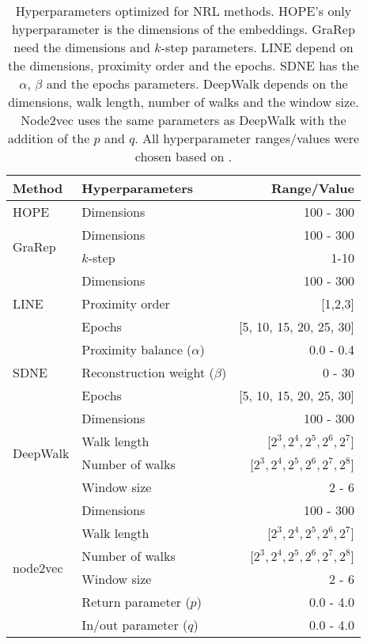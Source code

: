 \begin{table}[ht!]
    \centering
    \begin{tabular}{ |l|l|r| } 
        \hline
        \textbf{Method} & \textbf{Hyperparameters} & \textbf{Range/Value} \\
        \hline
        HOPE & Dimensions & 100 - 300 \\
        \hline
        \multirow{2}{5em}{GraRep} & Dimensions & 100 - 300 \\ 
            & $k$-step & 1-10 \\ 
        \hline
        \multirow{3}{4em}{LINE} & Dimensions & 100 - 300 \\ 
            & Proximity order & [1,2,3] \\
            & Epochs & [5, 10, 15, 20, 25, 30] \\
        \hline
        \multirow{3}{5em}{SDNE} & Proximity balance ($\alpha$) & 0.0 - 0.4 \\ 
            & Reconstruction weight ($\beta$) & 0 - 30 \\
            & Epochs & [5, 10, 15, 20, 25, 30] \\
        \hline
        \multirow{4}{5em}{DeepWalk} & Dimensions & 100 - 300 \\ 
            & Walk length & [$2^3, 2^4, 2^5, 2^6, 2^7$] \\
            & Number of walks & [$2^3, 2^4, 2^5, 2^6, 2^7, 2^8$] \\
            & Window size & 2 - 6 \\
        \hline
        \multirow{6}{5em}{node2vec} & Dimensions & 100 - 300 \\ 
            & Walk length & [$2^3, 2^4, 2^5, 2^6, 2^7$] \\
            & Number of walks & [$2^3, 2^4, 2^5, 2^6, 2^7, 2^8$] \\
            & Window size & 2 - 6 \\
            & Return parameter ($p$) & 0.0 - 4.0 \\
            & In/out parameter ($q$) & 0.0 - 4.0 \\
        \hline
    \end{tabular}
    \caption[Hyperparameters optimized for network representation learning methods]{Hyperparameters optimized for \ac{NRL} methods. HOPE's only hyperparameter is the dimensions of the embeddings. GraRep need the dimensions and $k$-step parameters. LINE depend on the dimensions, proximity order and the epochs. SDNE has the $\alpha$, $\beta$ and the epochs parameters. DeepWalk depends on the dimensions, walk length, number of walks and the window size. Node2vec uses the same parameters as DeepWalk with the addition of the $p$ and $q$. All hyperparameter ranges/values were chosen based on \cite{yue_graph_2019}.} 
    \label{tab:hyperparameters}
\end{table}

